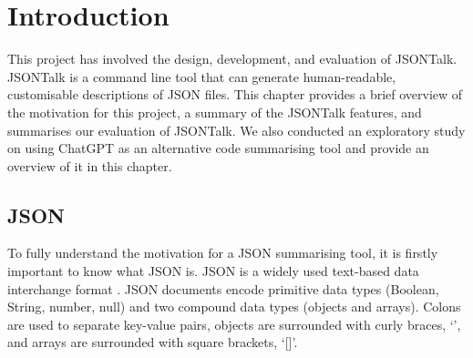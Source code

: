 \documentclass{l4proj}
\begin{document}
\tableofcontents

%
%
%
%
%
%
%
%
\chapter{Introduction}


This project has involved the design, development, and evaluation of JSONTalk. JSONTalk is a command line tool that can generate human-readable, customisable descriptions of JSON files. This chapter provides a brief overview of the motivation for this project, a summary of the JSONTalk features, and summarises our evaluation of JSONTalk. We also conducted an exploratory study on using ChatGPT as an alternative code summarising tool and provide an overview of it in this chapter.

\section{JSON}
To fully understand the motivation for a JSON summarising tool, it is firstly important to know what JSON is. JSON is a widely used text-based data interchange format \cite{JSON}. JSON documents encode primitive data types (Boolean, String, number, null) and two compound data types (objects and arrays). Colons are used to separate key-value pairs, objects are surrounded with curly braces, ‘{}’, and arrays are surrounded with square brackets, ‘[]’.  
\end{document}
